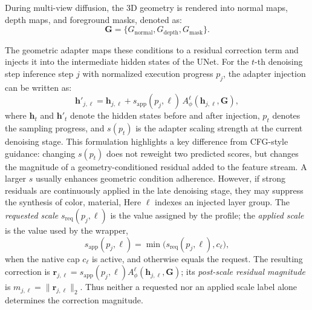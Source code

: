 \documentclass[times,twocolumn,final]{elsarticle}
\providecommand{\DIFadd}[1]{{\protect\color{blue} \sf #1}} %
\providecommand{\DIFdel}[1]{{\protect\color{red} \scriptsize #1}} %
\providecommand{\DIFaddbegin}{} %
\providecommand{\DIFaddend}{} %
\providecommand{\DIFdelbegin}{} %
\providecommand{\DIFdelend}{} %
\begin{document}
During multi-view diffusion, the 3D geometry is rendered into normal maps, depth maps, and foreground masks, denoted as:
\begin{equation}
\mathbf{G} = \{G_\text{normal}, G_\text{depth}, G_\text{mask}\}.
\end{equation}

The geometric adapter maps these conditions to a residual correction term and injects it into the intermediate hidden states of the UNet. For \DIFdelbegin \DIFdel{the $t$-th denoising step }\DIFdelend \DIFaddbegin \DIFadd{inference step $j$ with normalized execution progress $p_j$}\DIFaddend , the adapter injection can be written as:
\DIFdelbegin %
\DIFdelend \DIFaddbegin \begin{equation}
\mathbf{h}'_{j,\ell} = \mathbf{h}_{j,\ell} + s_{\mathrm{app}}(p_j,\ell)\, A^\ell_\phi(\mathbf{h}_{j,\ell}, \mathbf{G}),
\label{eq:injection}
\end{equation}\DIFaddend 
\DIFdelbegin \DIFdel{where $\mathbf{h}_t$ and $\mathbf{h}'_t$ denote the hidden states before and after injection,
$p_t$ denotes the sampling progress, and $s(p_t)$ is the adapter scaling strength at the current denoising stage. This formulation highlights a key difference from CFG-style guidance: changing $s(p_t)$ does not reweight two predicted scores, but changes the magnitude of a geometry-conditioned residual added to the feature stream. A larger $s$ usually enhances geometric condition adherence. However, if strong residuals are continuously applied in the late denoising stage, they may suppress the synthesis of color, material, }\DIFdelend \DIFaddbegin \DIFadd{Here $\ell$ indexes an injected layer group. The \emph{requested scale} $s_{\mathrm{req}}(p_j,\ell)$ is the value assigned by the profile; the \emph{applied scale} is the value used by the wrapper,
}\begin{equation}
s_{\mathrm{app}}(p_j,\ell)=\min\!\bigl(s_{\mathrm{req}}(p_j,\ell),c_\ell\bigr),
\end{equation}
\DIFadd{when the native cap $c_\ell$ is active, and otherwise equals the request. The resulting correction is $\mathbf{r}_{j,\ell}=s_{\mathrm{app}}(p_j,\ell)A^\ell_\phi(\mathbf{h}_{j,\ell},\mathbf{G})$; its \emph{post-scale residual magnitude} is $m_{j,\ell}=\|\mathbf{r}_{j,\ell}\|_2$. Thus neither a requested nor an applied scale label alone determines the correction magnitude.
}
\end{document}
